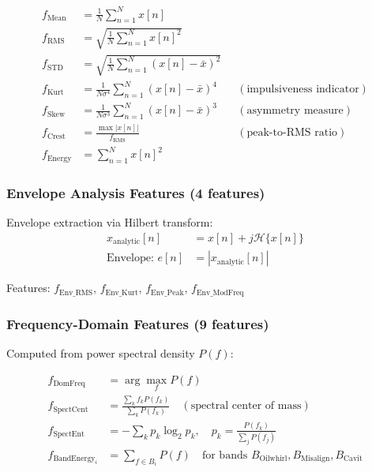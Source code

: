 \documentclass[11pt,a4paper]{article}
\begin{document}
\begin{align}
f_{\text{Mean}} &= \frac{1}{N}\sum_{n=1}^{N} x[n] \\
f_{\text{RMS}} &= \sqrt{\frac{1}{N}\sum_{n=1}^{N} x[n]^2} \\
f_{\text{STD}} &= \sqrt{\frac{1}{N}\sum_{n=1}^{N} (x[n] - \bar{x})^2} \\
f_{\text{Kurt}} &= \frac{1}{N\sigma^4}\sum_{n=1}^{N} (x[n] - \bar{x})^4 \quad &(\text{impulsiveness indicator}) \\
f_{\text{Skew}} &= \frac{1}{N\sigma^3}\sum_{n=1}^{N} (x[n] - \bar{x})^3 \quad &(\text{asymmetry measure}) \\
f_{\text{Crest}} &= \frac{\max|x[n]|}{f_{\text{RMS}}} \quad &(\text{peak-to-RMS ratio}) \\
f_{\text{Energy}} &= \sum_{n=1}^{N} x[n]^2
\end{align}

\subsubsection{Envelope Analysis Features (4 features)}

Envelope extraction via Hilbert transform:
\begin{align}
x_{\text{analytic}}[n] &= x[n] + j\mathcal{H}\{x[n]\} \\
\text{Envelope: } e[n] &= |x_{\text{analytic}}[n]|
\end{align}

Features: $f_{\text{Env\_RMS}}$, $f_{\text{Env\_Kurt}}$, $f_{\text{Env\_Peak}}$, $f_{\text{Env\_ModFreq}}$

\subsubsection{Frequency-Domain Features (9 features)}

Computed from power spectral density $P(f)$:

\begin{align}
f_{\text{DomFreq}} &= \arg\max_f P(f) \\
f_{\text{SpectCent}} &= \frac{\sum_k f_k P(f_k)}{\sum_k P(f_k)} \quad (\text{spectral center of mass}) \\
f_{\text{SpectEnt}} &= -\sum_k p_k \log_2 p_k, \quad p_k = \frac{P(f_k)}{\sum_j P(f_j)} \\
f_{\text{BandEnergy}_i} &= \sum_{f \in B_i} P(f) \quad \text{for bands } B_{\text{Oilwhirl}}, B_{\text{Misalign}}, B_{\text{Cavit}}
\end{align}
\end{document}
